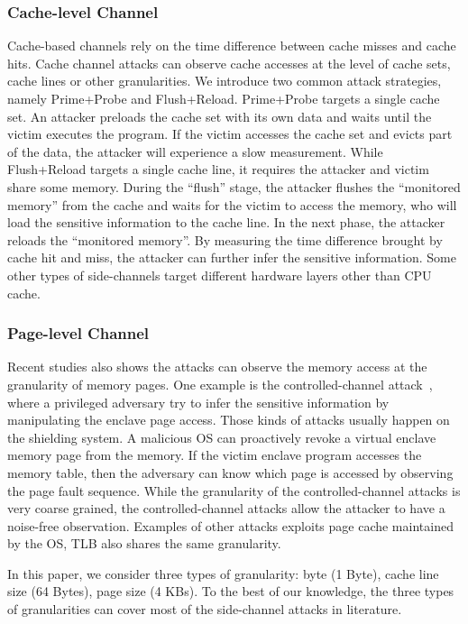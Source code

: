 \subsubsection{Cache-level Channel}
Cache-based channels rely on the time difference between cache misses and cache hits. Cache channel attacks can observe cache accesses at the level of cache sets, cache lines or other granularities. 
We introduce two common attack strategies, namely Prime+Probe and
Flush+Reload. Prime+Probe targets a single cache set. An
attacker preloads the cache set with its own data and waits until the victim
executes the program. If the victim accesses the cache set and evicts part of
the data, the attacker will experience a slow measurement. 
While Flush+Reload targets a single cache line, it requires the attacker and victim share some memory. During the ``flush'' stage, the attacker flushes the ``monitored
memory'' from the cache and waits for the victim to access the memory,
who will load the sensitive information to the cache line. In the next phase,
the attacker reloads the ``monitored memory''. By measuring the time difference
brought by cache hit and miss, the attacker can further infer the sensitive information. Some other types of side-channels target different hardware
layers other than CPU cache.

\subsubsection{Page-level Channel}
Recent studies also shows the attacks can observe the memory access at the granularity of memory pages. One example is the controlled-channel attack~\cite{xu2015controlled}, where a privileged adversary try to infer the sensitive information by manipulating the enclave page access. Those kinds of attacks usually happen on the shielding system. A malicious OS can proactively revoke a virtual enclave memory page from the memory. If the victim enclave program accesses the memory table, then the adversary can know which page is accessed by observing the page fault sequence. While the granularity of the controlled-channel attacks is very coarse grained, the controlled-channel attacks allow the attacker to have a noise-free observation. Examples of other attacks exploits page cache maintained by the OS, TLB also shares the same granularity.


In this paper, we consider three types of granularity: byte (1 Byte), cache line size (64 Bytes), page size (4 KBs). To the best of our knowledge, the three types of granularities can cover most of the side-channel attacks in literature.


